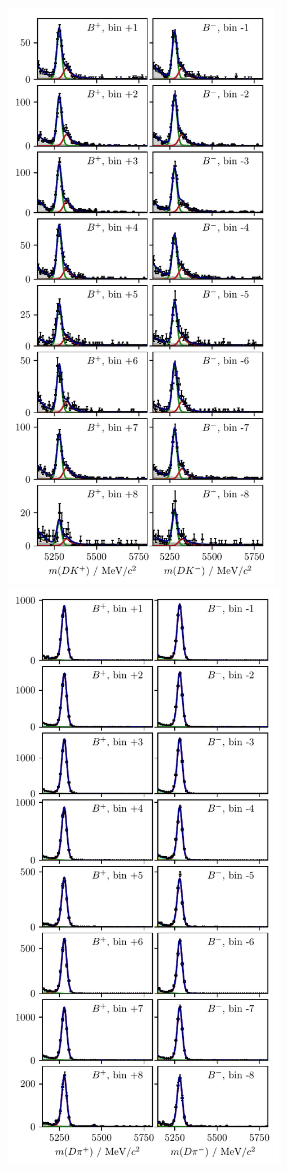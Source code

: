 \begin{figure}[tp]
    \centering
    \includegraphics[height=6in]{figures/analysis/bin_by_bin/pretty_fit_bins_dk_LL_2.pdf}
    \includegraphics[height=6in]{figures/analysis/bin_by_bin/pretty_fit_bins_dpi_LL_2.pdf}

\end{figure}
